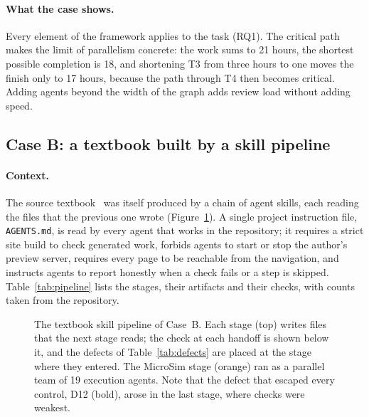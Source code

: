 \paragraph{What the case shows.} Every element of the framework applies to the task
(RQ1). The critical path makes the limit of parallelism concrete: the work sums to 21
hours, the shortest possible completion is 18, and shortening T3 from three hours to one
moves the finish only to 17 hours, because the path through T4 then becomes critical.
Adding agents beyond the width of the graph adds review load without adding speed.

\subsection{Case B: a textbook built by a skill pipeline}
\label{sec:case-b}

\paragraph{Context.} The source textbook~\cite{mccreary2026aiforee} was itself produced by
a chain of agent skills, each reading the files that the previous one wrote
(Figure~\ref{fig:pipeline}). A single project instruction file, \texttt{AGENTS.md}, is read
by every agent that works in the repository; it requires a strict site build to check
generated work, forbids agents to start or stop the author's preview server, requires every page
to be reachable from the navigation, and instructs agents to report honestly when a check
fails or a step is skipped. Table~\ref{tab:pipeline} lists the stages, their artifacts and
their checks, with counts taken from the repository.

\begin{figure}[htbp]
  \centering
  
  \caption{The textbook skill pipeline of Case~B. Each stage (top) writes files that the
  next stage reads; the check at each handoff is shown below it, and the defects of
  Table~\ref{tab:defects} are placed at the stage where they entered. The MicroSim stage
  (orange) ran as a parallel team of 19 execution agents. Note that the defect that
  escaped every control, D12 (bold), arose in the last stage, where checks were weakest.}
  \label{fig:pipeline}
\end{figure}

